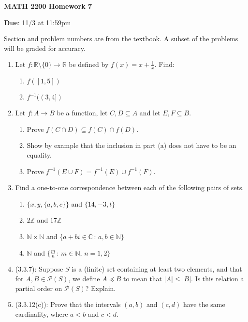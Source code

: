 \documentclass[10pt]{article}
\begin{document}
\begin{center}
\textbf{MATH 2200 Homework 7}

\textbf{Due}: 11/3 at 11:59pm
\end{center}

Section and problem numbers are from the textbook. A subset of the problems will be graded for accuracy.

\begin{enumerate}

\item Let $f:\mathbb{R}\setminus \{0\}\to \mathbb{R}$ be defined by $f(x) = x + \frac{1}{x}$. Find:
\begin{enumerate}
  \item $f([1,5])$
  \item $f^{-1}((3,4])$
\end{enumerate}

\item Let $f:A\to B$ be a function, let $C,D\subseteq A$ and let $E,F\subseteq B$.
\begin{enumerate}
  \item Prove $f(C\cap D)\subseteq f(C)\cap f(D)$.
  \item Show by example that the inclusion in part (a) does not have to be an equality.
  \item Prove $f^{-1}(E\cup F) = f^{-1}(E)\cup f^{-1}(F)$.
\end{enumerate}

\item Find a one-to-one correspondence between each of the following pairs of sets.
\begin{enumerate}
  \item $\{x,y,\{a,b,c\}\}$ and $\{14,-3,t\}$
  \item $2\mathbb{Z}$ and $17\mathbb{Z}$
  \item $\mathbb{N}\times \mathbb{N}$ and $\{a+bi\in \mathbb{C}\,:\, a,b\in \mathbb{N}\}$
  \item $\mathbb{N}$ and $\{\frac{m}{n}\,:\, m\in \mathbb{N},\, n=1,2\}$
\end{enumerate}	

\item (3.3.7): Suppose $S$ is a (finite) set containing at least two elements, and that for
$A,B\in \mathcal{P}(S)$, we define $A\preceq B$ to mean that $|A|\leq |B|$. Is this relation a
partial order on $\mathcal{P}(S)$? Explain.

\item (3.3.12(c)): Prove that the intervals $(a,b)$ and $(c,d)$ have the same cardinality, where
$a < b$ and $c < d$.


\end{enumerate}
\end{document}
